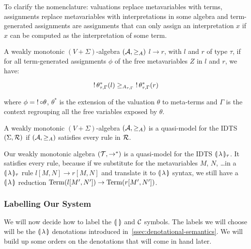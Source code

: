 To clarify the nomenclature: valuations replace metavariables with terms,
assignments replace metavariables with interpretations in some algebra and
term-generated assignments are assignments that can only assign an
interpretation $x$ if $x$ can be computed as the interpretation of some
term.

\begin{definition}
  A weakly monotonic $(V+\Sigma)$-algebra $(\mathcal{A}, \ge_A)$  $l \to r$, with $l$ and $r$ of type $\tau$, if
  for all term-generated assignments $\phi$ of the free metavariables $Z$
  in $l$ and $r$, we have:

  $$
  \mathop{!} \theta^*_{\tau,\Gamma}(l) \ge_{A_{\tau,\Gamma}} \mathop{!} \theta^*_{\tau,\Gamma}(r)
  $$

  where $\phi = \mathop{!} {\mathbin{\circ}} \theta$, $\theta^*$ is the extension of the
  valuation $\theta$ to meta-terms and $\Gamma$ is the context regrouping
  all the free variables exposed by $\theta$.
\end{definition}

\begin{definition}
  A weakly monotonic $(V+\Sigma)$-algebra $(\mathcal{A}, \ge_A)$ is a quasi-model
  for the IDTS $(\Sigma, \mathcal{R})$ if $(\mathcal{A}, \ge_A)$ satisfies every rule in
  $\mathcal{R}$.
\end{definition}

Our weakly monotonic algebra $(\mathcal{T}, \to^*)$ is a quasi-model for the IDTS
$\llparenthesis \, \lambda \, \rrparenthesis_\tau$. It satisfies every rule, because if we substitute
for the metavariables $M$, $N$, \ldots in a $\llparenthesis \, \lambda \, \rrparenthesis_\tau$ rule
$l[M,N] \to r[M,N]$ and translate it to $\llparenthesis \, \lambda \, \rrparenthesis$ syntax, we still
have a $\llparenthesis \, \lambda \, \rrparenthesis$ reduction $\operatorname{Term}(l[M',N']) \to \operatorname{Term}(r[M',N'])$.


\subsubsection{Labelling Our System}

We will now decide how to label the $\llparenthesis \,  \, \rrparenthesis$ and $\mathcal{C}$ symbols. The
labels we will choose will be the $\llparenthesis \, \lambda \, \rrparenthesis$ denotations introduced
in~\ref{ssec:denotational-semantics}. We will build up some orders on the
denotations that will come in hand later.

